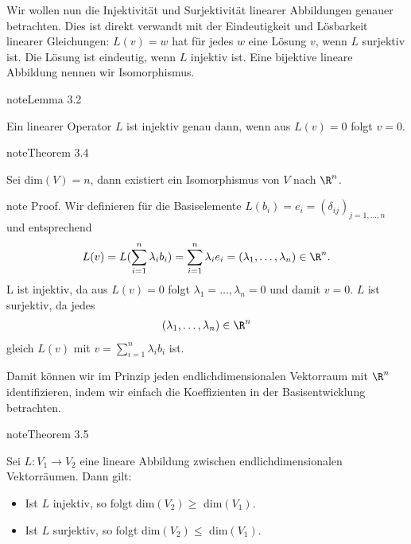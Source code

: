 \documentclass[letterpaper,10pt,english]{jupyterBook}
\begin{document}
Wir wollen nun die Injektivität und Surjektivität linearer Abbildungen genauer betrachten. Dies ist direkt verwandt mit der Eindeutigkeit und Lösbarkeit linearer Gleichungen: \(L(v) = w\) hat für jedes \(w\) eine Lösung \(v\), wenn \(L\) surjektiv ist. Die Lösung ist eindeutig, wenn \(L\) injektiv ist. Eine bijektive lineare Abbildung nennen wir Isomorphismus.
\label{vektorraeume/LineareAbb:lemma-4}
\begin{sphinxadmonition}{note}{Lemma 3.2}



Ein linearer Operator \(L\) ist injektiv genau dann, wenn aus \(L(v) = 0\) folgt \(v=0\).
\end{sphinxadmonition}
\label{vektorraeume/LineareAbb:theorem-5}
\begin{sphinxadmonition}{note}{Theorem 3.4}



Sei dim\((V) =n\), dann existiert ein Isomorphismus von \(V\) nach \(\R^n\).
\end{sphinxadmonition}

\begin{sphinxadmonition}{note}
Proof.  Wir definieren für die Basiselemente \(L(b_i) = e_i = (\delta_{ij})_{j=1,\ldots,n}\) und entsprechend
\begin{equation*}
\begin{split} L(v) = L(\sum_{i=1}^n \lambda_i b_i) = \sum_{i=1}^n \lambda_i e_i = (\lambda_1, \ldots, \lambda_n) \in \R^n .\end{split}
\end{equation*}
L ist injektiv, da aus \(L(v) = 0\) folgt \(\lambda_1=\ldots,\lambda_n = 0\) und damit \(v=0\). \(L\) ist surjektiv, da jedes
\begin{equation*}
\begin{split} (\lambda_1, \ldots, \lambda_n) \in \R^n \end{split}
\end{equation*}
gleich \(L(v)\) mit \(v = \sum_{i=1}^n \lambda_i b_i\) ist.
\end{sphinxadmonition}

Damit können wir im Prinzip jeden endlichdimensionalen Vektorraum mit \(\R^n\) identifizieren, indem wir einfach die Koeffizienten in der Basisentwicklung betrachten.
\label{vektorraeume/LineareAbb:theorem-6}
\begin{sphinxadmonition}{note}{Theorem 3.5}



Sei \(L: V_1 \rightarrow V_2\) eine lineare Abbildung zwischen endlichdimensionalen Vektorräumen. Dann gilt:
\begin{itemize}
\item {} 
Ist \(L\) injektiv, so folgt dim\((V_2) \geq \) dim\((V_1)\).

\item {} 
Ist \(L\) surjektiv, so folgt dim\((V_2) \leq \) dim\((V_1)\).

\end{itemize}
\end{sphinxadmonition}
\end{document}
